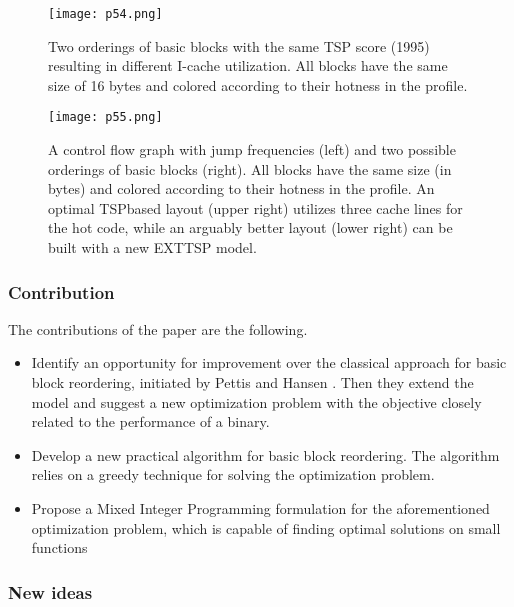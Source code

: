 \begin{figure}[H]
    \centering
     \texttt{[image: p54.png]}
         \caption{ Two orderings of basic blocks with the same TSP score (1995)
         resulting in different I-cache utilization. All blocks have the same size of
         16 bytes and colored according to their hotness in the profile.}
         \label{fig:p54}
\end{figure}


\begin{figure}[H]
    \centering
     \texttt{[image: p55.png]}
         \caption{A control flow graph with jump frequencies (left) and two possible
         orderings of basic blocks (right). All blocks have the same size (in bytes)
         and colored according to their hotness in the profile. An optimal TSPbased layout (upper right) utilizes three cache lines for the hot code,
         while an arguably better layout (lower right) can be built with a new
         EXTTSP model.}
         \label{fig:p55}
\end{figure}


\subsubsection{Contribution}

The contributions of the paper are the following.

\begin{itemize}
\item  Identify an opportunity for improvement over the
classical approach for basic block reordering, initiated
by Pettis and Hansen \cite{pettis1990profile}. Then they extend the model and
suggest a new optimization problem with the objective
closely related to the performance of a binary.

\item Develop a new practical algorithm for basic
block reordering. The algorithm relies on a greedy
technique for solving the optimization problem.

\item Propose a Mixed Integer Programming formulation
for the aforementioned optimization problem, which is
capable of finding optimal solutions on small functions
\end{itemize}

\subsubsection{New ideas}

